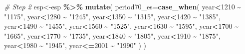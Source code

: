 \documentclass[
]{article}
\newenvironment{Shaded}{\begin{snugshade}}{\end{snugshade}}
\newcommand{\AttributeTok}[1]{\textcolor[rgb]{0.13,0.29,0.53}{#1}}
\newcommand{\CommentTok}[1]{\textcolor[rgb]{0.56,0.35,0.01}{\textit{#1}}}
\newcommand{\DecValTok}[1]{\textcolor[rgb]{0.00,0.00,0.81}{#1}}
\newcommand{\FunctionTok}[1]{\textcolor[rgb]{0.13,0.29,0.53}{\textbf{#1}}}
\newcommand{\NormalTok}[1]{#1}
\newcommand{\OtherTok}[1]{\textcolor[rgb]{0.56,0.35,0.01}{#1}}
\newcommand{\SpecialCharTok}[1]{\textcolor[rgb]{0.81,0.36,0.00}{\textbf{#1}}}
\newcommand{\StringTok}[1]{\textcolor[rgb]{0.31,0.60,0.02}{#1}}
\begin{document}
\begin{Shaded}
\begin{Highlighting}[]
\CommentTok{\# Step 2}
\NormalTok{esp}\OtherTok{\textless{}{-}}\NormalTok{esp }\SpecialCharTok{\%\textgreater{}\%} 
  \FunctionTok{mutate}\NormalTok{(}
    \AttributeTok{period70\_es=}\FunctionTok{case\_when}\NormalTok{(}
\NormalTok{      year}\SpecialCharTok{\textless{}}\DecValTok{1210} \SpecialCharTok{\textasciitilde{}} \StringTok{"1175"}\NormalTok{,}
\NormalTok{      year}\SpecialCharTok{\textless{}}\DecValTok{1280} \SpecialCharTok{\textasciitilde{}} \StringTok{"1245"}\NormalTok{,}
\NormalTok{      year}\SpecialCharTok{\textless{}}\DecValTok{1350} \SpecialCharTok{\textasciitilde{}} \StringTok{"1315"}\NormalTok{, }
\NormalTok{      year}\SpecialCharTok{\textless{}}\DecValTok{1420} \SpecialCharTok{\textasciitilde{}} \StringTok{"1385"}\NormalTok{, }
\NormalTok{      year}\SpecialCharTok{\textless{}}\DecValTok{1490} \SpecialCharTok{\textasciitilde{}} \StringTok{"1455"}\NormalTok{,}
\NormalTok{      year}\SpecialCharTok{\textless{}}\DecValTok{1560} \SpecialCharTok{\textasciitilde{}} \StringTok{"1525"}\NormalTok{,}
\NormalTok{      year}\SpecialCharTok{\textless{}}\DecValTok{1630} \SpecialCharTok{\textasciitilde{}} \StringTok{"1595"}\NormalTok{,}
\NormalTok{      year}\SpecialCharTok{\textless{}}\DecValTok{1700} \SpecialCharTok{\textasciitilde{}} \StringTok{"1665"}\NormalTok{,}
\NormalTok{      year}\SpecialCharTok{\textless{}}\DecValTok{1770} \SpecialCharTok{\textasciitilde{}} \StringTok{"1735"}\NormalTok{,}
\NormalTok{      year}\SpecialCharTok{\textless{}}\DecValTok{1840} \SpecialCharTok{\textasciitilde{}} \StringTok{"1805"}\NormalTok{,}
\NormalTok{      year}\SpecialCharTok{\textless{}}\DecValTok{1910} \SpecialCharTok{\textasciitilde{}} \StringTok{"1875"}\NormalTok{,}
\NormalTok{      year}\SpecialCharTok{\textless{}}\DecValTok{1980} \SpecialCharTok{\textasciitilde{}} \StringTok{"1945"}\NormalTok{,}
\NormalTok{      year}\SpecialCharTok{\textless{}=}\DecValTok{2001} \SpecialCharTok{\textasciitilde{}} \StringTok{"1990"}
\NormalTok{    )}
\NormalTok{  )}


\end{Highlighting}
\end{Shaded}
\end{document}
